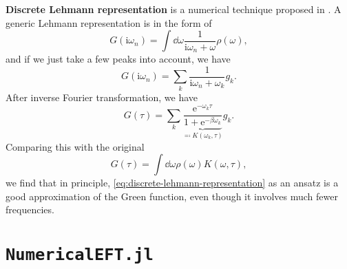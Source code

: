 \documentclass[hyperref, a4paper]{article}
\newcommand*{\ii}{\mathrm{i}}
\newcommand*{\ee}{\mathrm{e}}
\newcommand*{\concept}[1]{{\textbf{#1}}}
\begin{document}
\concept{Discrete Lehmann representation} is a numerical technique proposed in \cite{PhysRevB.104.195142}.
A generic Lehmann representation is in the form of 
\begin{equation}
    G(\ii \omega_n) = \int \dd{\omega} \frac{1}{\ii \omega_n + \omega} \rho(\omega),
\end{equation}
and if we just take a few peaks into account, we have 
\begin{equation}
    G(\ii \omega_n) = \sum_k \frac{1}{\ii \omega_n + \omega_k} g_k.
\end{equation}
After inverse Fourier transformation, we have 
\begin{equation}
    G(\tau) = \sum_k \underbrace{\frac{\ee^{- \omega_k \tau}}{1 + \ee^{- \beta \omega_k }}}_{\eqqcolon K(\omega_k, \tau)} g_k.
    \label{eq:discrete-lehmann-representation}
\end{equation}
Comparing this with the original 
\begin{equation}
    G(\tau) = \int \dd{\omega} \rho(\omega) K(\omega, \tau),
\end{equation}
we find that in principle, \eqref{eq:discrete-lehmann-representation} as an ansatz is a good approximation of
the Green function, even though it involves much fewer frequencies.

\section{\texttt{NumericalEFT.jl}}





\end{document}
